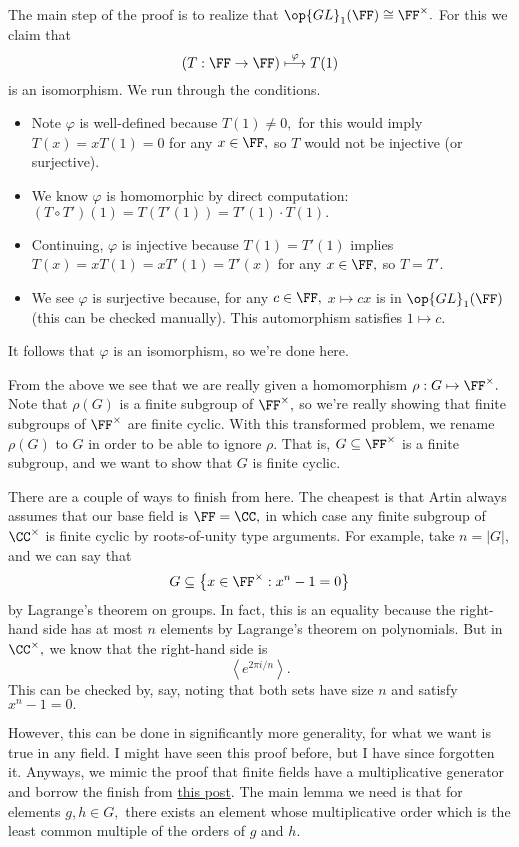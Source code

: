 The main step of the proof is to realize that $\op{GL}_1(\FF)\cong\FF^\times.$ For this we claim that
\[(T:\FF\to\FF)\stackrel\varphi\longmapsto T(1)\]
is an isomorphism. We run through the conditions.
\begin{itemize}
    \item Note $\varphi$ is well-defined because $T(1)\ne0,$ for this would imply $T(x)=xT(1)=0$ for any $x\in\FF,$ so $T$ would not be injective (or surjective).
    \item We know $\varphi$ is homomorphic by direct computation: $(T\circ T')(1)=T(T'(1))=T'(1)\cdot T(1).$
    \item Continuing, $\varphi$ is injective because $T(1)=T'(1)$ implies $T(x)=xT(1)=xT'(1)=T'(x)$ for any $x\in\FF,$ so $T=T'.$
    \item We see $\varphi$ is surjective because, for any $c\in\FF,$ $x\mapsto cx$ is in $\op{GL}_1(\FF)$ (this can be checked manually). This automorphism satisfies $1\mapsto c.$
\end{itemize}
It follows that $\varphi$ is an isomorphism, so we're done here.

From the above we see that we are really given a homomorphism $\rho:G\mapsto\FF^\times.$ Note that $\rho(G)$ is a finite subgroup of $\FF^\times,$ so we're really showing that finite subgroups of $\FF^\times$ are finite cyclic. With this transformed problem, we rename $\rho(G)$ to $G$ in order to be able to ignore $\rho.$ That is, $G\subseteq\FF^\times$ is a finite subgroup, and we want to show that $G$ is finite cyclic.

There are a couple of ways to finish from here. The cheapest is that Artin always assumes that our base field is $\FF=\CC,$ in which case any finite subgroup of $\CC^\times$ is finite cyclic by roots-of-unity type arguments. For example, take $n=|G|,$ and we can say that
\[G\subseteq\left\{x\in\FF^\times:x^n-1=0\right\}\]
by Lagrange's theorem on groups. In fact, this is an equality because the right-hand side has at most $n$ elements by Lagrange's theorem on polynomials. But in $\CC^\times,$ we know that the right-hand side is
\[\left\langle e^{2\pi i/n}\right\rangle.\]
This can be checked by, say, noting that both sets have size $n$ and satisfy $x^n-1=0.$

However, this can be done in significantly more generality, for what we want is true in any field. I might have seen this proof before, but I have since forgotten it. Anyways, we mimic the proof that finite fields have a multiplicative generator and borrow the finish from \href{https://math.stackexchange.com/a/335654/869257}{this post}. The main lemma we need is that for elements $g,h\in G,$ there exists an element whose multiplicative order which is the least common multiple of the orders of $g$ and $h.$

